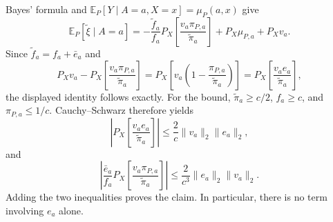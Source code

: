 Bayes' formula and \(\mathbb E_P[Y\mid A=a,X=x]=\mu_P(a,x)\) give
\[
\mathbb E_P[\widetilde\xi\mid A=a]
=-\frac{\widetilde f_a}{f_a}P_X\!\left[\frac{v_a\pi_{P,a}}{\widetilde\pi_a}\right]+P_X\mu_{P,a}+P_Xv_a.
\]
Since \(\widetilde f_a=f_a+\bar e_a\) and
\[
P_Xv_a-P_X\!\left[\frac{v_a\pi_{P,a}}{\widetilde\pi_a}\right]
=P_X\!\left[v_a\left(1-\frac{\pi_{P,a}}{\widetilde\pi_a}\right)\right]
=P_X\!\left[\frac{v_ae_a}{\widetilde\pi_a}\right],
\]
the displayed identity follows exactly. For the bound, \(\widetilde\pi_a\ge c/2\), \(f_a\ge c\), and \(\pi_{P,a}\le1/c\). Cauchy--Schwarz therefore yields
\[
\left\lvert P_X\!\left[\frac{v_ae_a}{\widetilde\pi_a}\right]\right\rvert
\le\frac2c\lVert v_a\rVert_2\lVert e_a\rVert_2,
\]
and
\[
\left\lvert\frac{\bar e_a}{f_a}P_X\!\left[\frac{v_a\pi_{P,a}}{\widetilde\pi_a}\right]\right\rvert
\le\frac{2}{c^3}\lVert e_a\rVert_2\lVert v_a\rVert_2.
\]
Adding the two inequalities proves the claim. In particular, there is no term involving \(e_a\) alone.